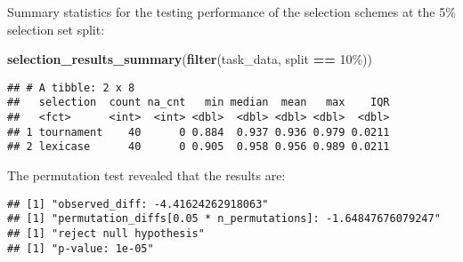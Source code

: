 \documentclass[
]{book}
\newenvironment{Shaded}{\begin{snugshade}}{\end{snugshade}}
\newcommand{\AttributeTok}[1]{\textcolor[rgb]{0.13,0.29,0.53}{#1}}
\newcommand{\DecValTok}[1]{\textcolor[rgb]{0.00,0.00,0.81}{#1}}
\newcommand{\FunctionTok}[1]{\textcolor[rgb]{0.13,0.29,0.53}{\textbf{#1}}}
\newcommand{\NormalTok}[1]{#1}
\newcommand{\OtherTok}[1]{\textcolor[rgb]{0.56,0.35,0.01}{#1}}
\newcommand{\SpecialCharTok}[1]{\textcolor[rgb]{0.81,0.36,0.00}{\textbf{#1}}}
\newcommand{\StringTok}[1]{\textcolor[rgb]{0.31,0.60,0.02}{#1}}
\begin{document}
Summary statistics for the testing performance of the selection schemes at the 5\% selection set split:

\begin{Shaded}
\begin{Highlighting}[]
\FunctionTok{selection\_results\_summary}\NormalTok{(}\FunctionTok{filter}\NormalTok{(task\_data, split }\SpecialCharTok{==} \StringTok{\textquotesingle{}10\%\textquotesingle{}}\NormalTok{))}
\end{Highlighting}
\end{Shaded}

\begin{verbatim}
## # A tibble: 2 x 8
##   selection  count na_cnt   min median  mean   max    IQR
##   <fct>      <int>  <int> <dbl>  <dbl> <dbl> <dbl>  <dbl>
## 1 tournament    40      0 0.884  0.937 0.936 0.979 0.0211
## 2 lexicase      40      0 0.905  0.958 0.956 0.989 0.0211
\end{verbatim}

The permutation test revealed that the results are:

\begin{Shaded}
\end{Shaded}

\begin{verbatim}
## [1] "observed_diff: -4.41624262918063"
## [1] "permutation_diffs[0.05 * n_permutations]: -1.64847676079247"
## [1] "reject null hypothesis"
## [1] "p-value: 1e-05"
\end{verbatim}
\end{document}

